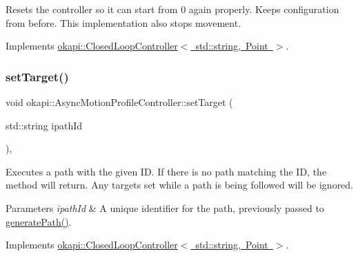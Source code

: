 Resets the controller so it can start from 0 again properly. Keeps configuration from before. This implementation also stops movement. 

Implements \mbox{\hyperlink{classokapi_1_1ClosedLoopController_a7dd6ce28b3e38bdf987514a1b6c83c8c}{okapi\+::\+Closed\+Loop\+Controller$<$ std\+::string, Point $>$}}.

\mbox{\label{classokapi_1_1AsyncMotionProfileController_adf705d6bfd3d0a83d8a6c50a05ffd156}} 
\subsubsection{\texorpdfstring{setTarget()}{setTarget()}\hspace{0.1cm}{\footnotesize\ttfamily [1/2]}}
{\footnotesize\ttfamily void okapi\+::\+Async\+Motion\+Profile\+Controller\+::set\+Target (\begin{DoxyParamCaption}\item[{std\+::string}]{ipath\+Id }\end{DoxyParamCaption})\hspace{0.3cm}{\ttfamily [override]}, {\ttfamily [virtual]}}

Executes a path with the given ID. If there is no path matching the ID, the method will return. Any targets set while a path is being followed will be ignored.


\begin{DoxyParams}{Parameters}
{\em ipath\+Id} & A unique identifier for the path, previously passed to \mbox{\hyperlink{classokapi_1_1AsyncMotionProfileController_a767919702ab379bac5273010baf03cda}{generate\+Path()}}. \\
\hline
\end{DoxyParams}


Implements \mbox{\hyperlink{classokapi_1_1ClosedLoopController_ac14482d0768b3f157d52e0214a4c36d7}{okapi\+::\+Closed\+Loop\+Controller$<$ std\+::string, Point $>$}}.

\mbox{\label{classokapi_1_1AsyncMotionProfileController_a2846d2e36b86b39aa2e761e4e34cd225}} 
